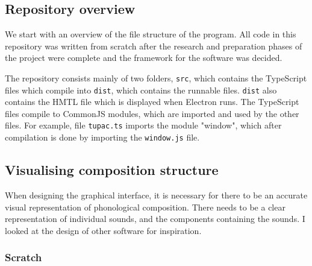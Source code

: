 \documentclass[12pt,a4paper,twoside,openright]{report}
\begin{document}
\subsection{Repository overview}
We start with an overview of the file structure of the program. All code in this repository was written from scratch after the research and preparation phases of the project were complete and the framework for the software was decided.

\DTsetlength{0.2em}{1em}{0.2em}{0.4pt}{2pt}
\setlength{\DTbaselineskip}{20pt}

The repository consists mainly of two folders, \verb|src|, which contains the TypeScript files which compile into \verb|dist|, which contains the runnable files. \verb|dist| also contains the HMTL file which is displayed when Electron runs. The TypeScript files compile to CommonJS modules, which are imported and used by the other files. For example, file \verb|tupac.ts| imports the module "window", which after compilation is done by importing the \verb|window.js| file.
\newpage
\subsection{Visualising composition structure}
When designing the graphical interface, it is necessary for there to be an accurate visual representation of phonological composition. There needs to be a clear representation of individual sounds, and the components containing the sounds. I looked at the design of other software for inspiration.

\subsubsection{Scratch}
\end{document}
